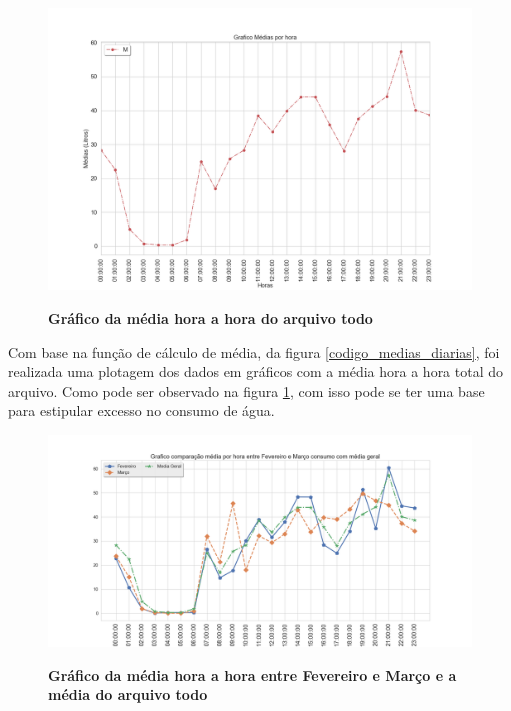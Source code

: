 \begin{figure}[ht]
	\caption{\textbf{Gráfico da média hora a hora do arquivo todo}}
	\centering
		\includegraphics[width=\textwidth,height=\textheight , keepaspectratio]{figuras/GraficoMediasPorHora(este)}
		\label{graf_media_h_h}
\end{figure}

\par Com base na função de cálculo de média, da figura \ref{codigo_medias_diarias}, foi realizada uma plotagem dos dados em gráficos com a média hora a hora total do arquivo. Como pode ser observado na figura \ref{graf_media_h_h}, com isso pode se ter uma base para estipular excesso no consumo de água. 

\begin{figure}[ht]
	\caption{\textbf{Gráfico da média hora a hora entre Fevereiro e Março e a média do arquivo todo}}
	\centering
		\includegraphics[width=\textwidth,height=\textheight , keepaspectratio]{figuras/comparacaomediahorarientredoismesesconsumo}
		\label{graf_media_h_h_2meses}
\end{figure}

